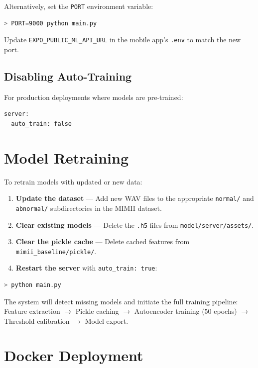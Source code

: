 \documentclass[10pt, a4paper, oneside]{report}
\begin{document}
Alternatively, set the \texttt{PORT} environment variable:
\begin{lstlisting}[language=bash]
> PORT=9000 python main.py
\end{lstlisting}

\begin{warningbox}
Update \texttt{EXPO\_PUBLIC\_ML\_API\_URL} in the mobile app's \texttt{.env} to match the new port.
\end{warningbox}

\subsection{Disabling Auto-Training}

For production deployments where models are pre-trained:
\begin{lstlisting}
server:
  auto_train: false
\end{lstlisting}

\section{Model Retraining}
\label{sec:retraining}

To retrain models with updated or new data:
\begin{enumerate}[leftmargin=*, nosep]
  \item \textbf{Update the dataset} --- Add new WAV files to the appropriate \texttt{normal/} and \texttt{abnormal/} subdirectories in the MIMII dataset.
  \item \textbf{Clear existing models} --- Delete the \texttt{.h5} files from \texttt{model/server/assets/}.
  \item \textbf{Clear the pickle cache} --- Delete cached features from \texttt{mimii\_baseline/pickle/}.
  \item \textbf{Restart the server} with \texttt{auto\_train: true}:
\end{enumerate}

\begin{lstlisting}[language=bash]
> python main.py
\end{lstlisting}

The system will detect missing models and initiate the full training pipeline:
Feature extraction $\rightarrow$ Pickle caching $\rightarrow$ Autoencoder training (50 epochs) $\rightarrow$ Threshold calibration $\rightarrow$ Model export.

\section{Docker Deployment}
\label{sec:docker}
\end{document}

